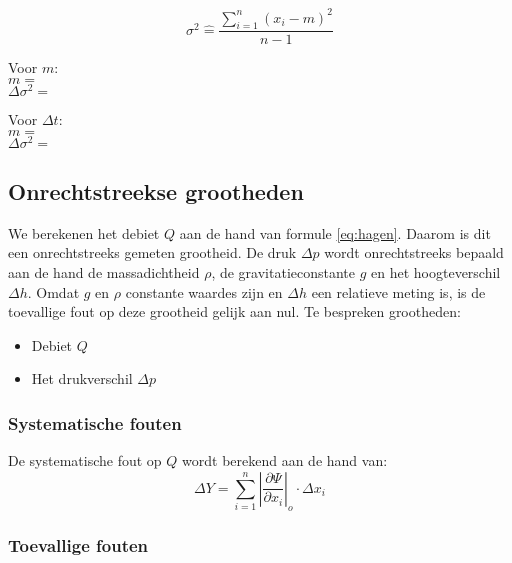 \begin{equation}
    \sigma^{2} \hat{=} \frac{\sum\limits_{i=1}^n (x_i - m)^2}{n - 1}
\end{equation} 

Voor $m$:
\\$m = $ %
\\$\Delta \sigma^{2} = $ %

Voor $\Delta t$:
\\$m = $ %
\\$\Delta \sigma^{2} = $ %



\subsection{Onrechtstreekse grootheden}

We berekenen het debiet $Q$ aan de hand van formule \eqref{eq:hagen}. Daarom is dit een onrechtstreeks gemeten grootheid.
De druk $\Delta p$ wordt onrechtstreeks bepaald aan de hand de massadichtheid $\rho$, de gravitatieconstante $g$ en het hoogteverschil $\Delta h$. Omdat $g$ en $\rho$ constante waardes zijn en $\Delta h$ een relatieve meting is, is de toevallige fout op deze grootheid gelijk aan nul.
Te bespreken grootheden:
\begin{itemize}
    \item Debiet $Q$
    \item Het drukverschil $\Delta p$
\end{itemize}

\subsubsection{Systematische fouten}
De systematische fout op $Q$ wordt berekend aan de hand van:
\begin{equation}
    \Delta Y = \sum\limits_{i=1}^n \left|\frac{\partial \Psi}{\partial x_i}\right|_o \cdot \Delta x_i
\end{equation}

\subsubsection{Toevallige fouten}

